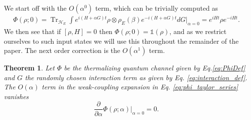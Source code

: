 \documentclass[
 amsmath,amssymb,
 aps,
onecolumn, 
nofootinbib]{revtex4-2}
\newtheorem{theorem}{Theorem}
\newcommand{\bigo}[1]{O\left(#1\right)}
\DeclareMathOperator{\Tr}{Tr}
\newcommand{\hilb}{\mathcal{H}}
\newcommand{\identity}{\mathds{1}}
\begin{document}
We start off with the $\bigo{\alpha^0}$ term, which can be trivially computed as
\begin{align}
\Phi(\rho; 0) = \Tr_{\hilb_E}\int e^{i(H + \alpha G) t} \rho \otimes \rho_E(\beta) e^{-i (H + \alpha G) t} dG \bigg|_{\alpha = 0} = e^{i H t} \rho e^{-i H t}.
\end{align}
We then see that if $[ \rho, H] = 0$ then $\Phi(\rho; 0) = \identity(\rho)$, and as we restrict ourselves to such input states we will use this throughout the remainder of the paper. The next order correction is the $\bigo{\alpha^1}$ term. 
\begin{theorem} \label{lem:first_order_phi}
Let $\Phi$ be the thermalizing quantum channel given by Eq.\eqref{eq:PhiDef} and $G$ the randomly chosen interaction term as given by Eq. \eqref{eq:interaction_def}. The $O(\alpha)$ term in the weak-coupling expansion in Eq. \eqref{eq:phi_taylor_series} vanishes
   \begin{equation}
        \frac{\partial}{\partial \alpha} \Phi(\rho; \alpha) \big|_{\alpha = 0} = 0.
   \end{equation}
\end{theorem}
\end{document}
